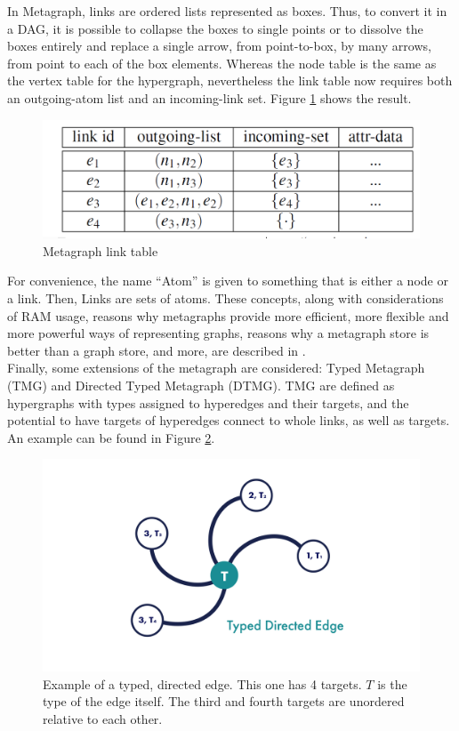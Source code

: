 In Metagraph, links are ordered lists represented as boxes. Thus, to convert it in a DAG, it is possible to collapse the boxes to single points or to dissolve the boxes entirely and replace a single arrow, from point-to-box, by many arrows, from point to each of the box elements. 
Whereas the node table is the same as the vertex table for the hypergraph, nevertheless the link table now requires both an outgoing-atom list and an incoming-link set.
Figure \ref{fig:metagraph_table} shows the result.

\begin{figure} [h]
\centering
\includegraphics[width=0.8
\textwidth]{figures/Magistrale/metagraph_table}
\caption[Metagraph link table]{Metagraph link table
\label{fig:metagraph_table}}
\end{figure}

For convenience, the name \enquote{Atom} is given to something that is either a node or a link. Then, Links are sets of atoms.
These concepts, along with considerations of RAM usage, reasons why metagraphs provide more efficient, more flexible and more powerful ways of representing graphs, reasons why a metagraph store is better than a graph store, and more, are described in \cite{Vep20a, metagraph_app}. \\
Finally, some extensions of the metagraph are considered: Typed Metagraph (TMG) and Directed Typed Metagraph (DTMG).
TMG are defined as hypergraphs with types assigned to hyperedges and their targets, and the potential to have targets of hyperedges connect to whole links, as well as targets. 
An example can be found in Figure \ref{fig:typed_edge}. \\

\begin{figure}[h]
\centering
\includegraphics[width=0.6
\textwidth]{figures/Magistrale/typed_edge}
\caption[Typed Directed Edge]{Example of a typed, directed edge. This one has 4 targets. $T$ is the type of the edge itself. The third and fourth targets are unordered relative to each other.
\label{fig:typed_edge}}
\end{figure}

